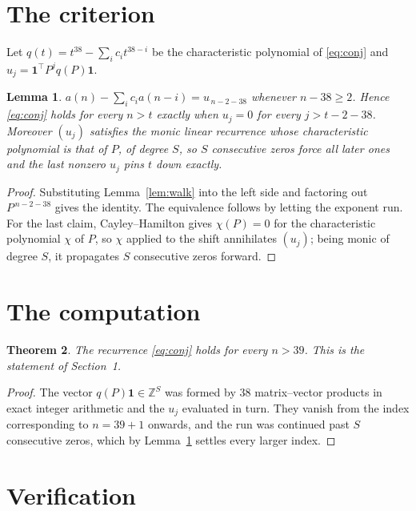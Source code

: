 \documentclass[11pt,a4paper]{article}
\theoremstyle{plain}
\newtheorem{theorem}{Theorem}
\newtheorem{lemma}[theorem]{Lemma}
\theoremstyle{definition}
\begin{document}
\section{The criterion}

Let $q(t)=t^{38}-\sum_i c_i t^{38-i}$ be the characteristic polynomial of
\eqref{eq:conj} and $u_j=\mathbf{1}^{\!\top}P^{j}q(P)\mathbf{1}$.

\begin{lemma}\label{lem:crit}
$a(n)-\sum_i c_i a(n-i)=u_{\,n-2-38}$ whenever $n-38\ge2$. Hence
\eqref{eq:conj} holds for every $n>t$ exactly when $u_j=0$ for every
$j>t-2-38$. Moreover $(u_j)$ satisfies the monic linear recurrence whose
characteristic polynomial is that of $P$, of degree $S$, so $S$ consecutive zeros force all
later ones and the last nonzero $u_j$ pins $t$ down exactly.
\end{lemma}

\begin{proof}
Substituting Lemma~\ref{lem:walk} into the left side and factoring out
$P^{\,n-2-38}$ gives the identity. The equivalence follows by letting the exponent
run. For the last claim, Cayley--Hamilton gives $\chi(P)=0$ for the characteristic
polynomial $\chi$ of $P$, so $\chi$ applied to the shift annihilates $(u_j)$; being monic of
degree $S$, it propagates $S$ consecutive zeros forward.
\end{proof}

\section{The computation}

\begin{theorem}
The recurrence \eqref{eq:conj} holds for every $n>39$. This is the statement of
Section~1.
\end{theorem}

\begin{proof}
The vector $q(P)\mathbf{1}\in\mathbb{Z}^{S}$ was formed by $38$ matrix--vector
products in exact integer arithmetic and the $u_j$ evaluated in turn. They vanish from the
index corresponding to $n=39+1$ onwards, and the run was continued past $S$ consecutive
zeros, which by Lemma~\ref{lem:crit} settles every larger index.
\end{proof}

\section{Verification}
\end{document}
